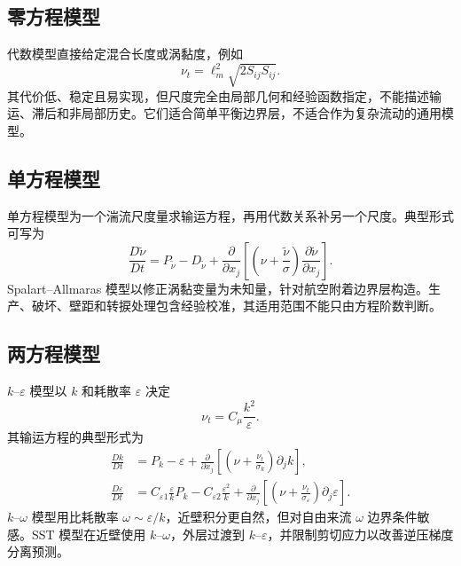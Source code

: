 \documentclass[12pt,a4paper,openany,fontset=none]{ctexbook}
\begin{document}
\subsection{零方程模型}

代数模型直接给定混合长度或涡黏度，例如
\begin{equation}
 \nu_t=\ell_m^2\sqrt{2S_{ij}S_{ij}}.
\end{equation}
其代价低、稳定且易实现，但尺度完全由局部几何和经验函数指定，不能描述输运、滞后和非局部历史。它们适合简单平衡边界层，不适合作为复杂流动的通用模型。

\subsection{单方程模型}

单方程模型为一个湍流尺度量求输运方程，再用代数关系补另一个尺度。典型形式可写为
\begin{equation}
 \frac{D\widetilde\nu}{Dt}=P_{\widetilde\nu}-D_{\widetilde\nu}
 +\frac{\partial}{\partial x_j}\left[\left(\nu+\frac{\widetilde\nu}{\sigma}\right)
 \frac{\partial\widetilde\nu}{\partial x_j}\right].
\end{equation}
Spalart--Allmaras 模型以修正涡黏变量为未知量，针对航空附着边界层构造。生产、破坏、壁距和转捩处理包含经验校准，其适用范围不能只由方程阶数判断。

\subsection{两方程模型}

$k$--$\varepsilon$ 模型以 $k$ 和耗散率 $\varepsilon$ 决定
\begin{equation}
 \nu_t=C_\mu\frac{k^2}{\varepsilon}.
\end{equation}
其输运方程的典型形式为
\begin{align}
 \frac{Dk}{Dt}&=P_k-\varepsilon+
 \frac{\partial}{\partial x_j}\left[\left(\nu+\frac{\nu_t}{\sigma_k}\right)\partial_jk\right],\\
 \frac{D\varepsilon}{Dt}&=C_{\varepsilon1}\frac{\varepsilon}{k}P_k
 -C_{\varepsilon2}\frac{\varepsilon^2}{k}
 +\frac{\partial}{\partial x_j}\left[\left(\nu+\frac{\nu_t}{\sigma_\varepsilon}\right)\partial_j\varepsilon\right].
\end{align}
$k$--$\omega$ 模型用比耗散率 $\omega\sim\varepsilon/k$，近壁积分更自然，但对自由来流 $\omega$ 边界条件敏感。SST 模型在近壁使用 $k$--$\omega$，外层过渡到 $k$--$\varepsilon$，并限制剪切应力以改善逆压梯度分离预测。
\end{document}
